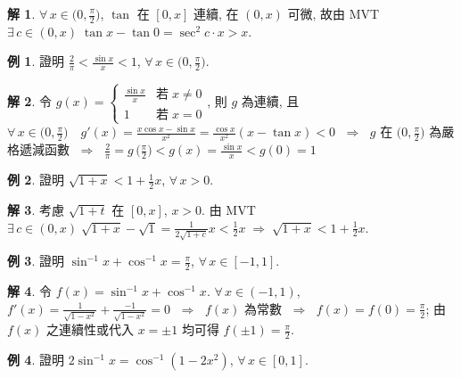 \documentclass[12pt]{extarticle}
\newcommand{\ds}{\displaystyle}
\newcommand{\ie}{\;\Longrightarrow\;}
\theoremstyle{definition}
\newtheorem*{ex}{例}
\newtheorem*{sol}{解}
\begin{document}
\begin{sol}
  $\ds\forall\,x\in\big(0, \frac{\pi}{2}\big)$, $\ds\tan$ 在 $[0, x]$ 連續, 在 $(0, x)$ 可微, 故由 MVT $\ds\exists\,c\in(0, x)\;\tan x - \tan 0 = \sec^2 c\cdot x > x$. 
\end{sol}

\begin{ex}
  證明 $\ds\frac{2}{\pi} < \frac{\sin x}{x} < 1$, $\ds\forall\,x\in\big(0, \frac{\pi}{2}\big)$. 
\end{ex}

\begin{sol}
  令 $\ds g(x) = \begin{cases}\frac{\sin x}{x} & \text{若}\;x\ne 0 \\ 1 & \text{若}\;x = 0 \end{cases}$, 則 $g$ 為連續, 且 $\ds\forall\,x\in\Big(0,\frac{\pi}{2}\Big)\quad g'(x) = \frac{x\cos x - \sin x}{x^2} = \frac{\cos x}{x^2}(x - \tan x) < 0$ $\ie$ $g$ 在 $\ds\Big(0,\frac{\pi}{2}\Big)$ 為嚴格遞減函數 $\ie$ $\ds\frac{2}{\pi} = g\,\Big(\frac{\pi}{2}\Big) < g(x) = \frac{\sin x}{x} < g(0) = 1$     
\end{sol}

\begin{ex}
  證明 $\ds\sqrt{1 + x} < 1 + \frac{1}{2}x$, $\forall\,x > 0$. 
\end{ex}

\begin{sol}
  考慮 $\ds\sqrt{1 + t}$ 在 $\ds[0, x]$, $\ds x > 0$. 由 MVT $\ds\exists\,c\in(0, x)\;\sqrt{1 + x} - \sqrt{1} = \frac{1}{2\sqrt{1 + c}} x < \frac{1}{2}x \ie \sqrt{1 + x} < 1 + \frac{1}{2}x$. 
\end{sol}

\begin{ex}
  證明 $\ds\sin^{-1}x + \cos^{-1}x = \frac{\pi}{2}$, $\forall\,x\in[-1, 1]$. 
\end{ex}

\begin{sol}
  令 $\ds f(x) = \sin^{-1}x + \cos^{-1}x$. $\forall\,x\in(-1, 1)$, $\ds f'(x) = \frac{1}{\sqrt{1 - x^2}} + \frac{-1}{\sqrt{1 - x^2}} = 0$ $\ie$ $f(x)$ 為常數 $\ie$ $\ds f(x) = f(0) = \frac{\pi}{2}$; 由 $f(x)$ 之連續性或代入 $x = \pm 1$ 均可得 $\ds f(\pm 1) = \frac{\pi}{2}$.    
\end{sol}

\begin{ex}
  證明 $\ds 2\sin^{-1}x = \cos^{-1}(1 - 2x^2)$, $\forall\,x\in[0, 1]$. 
\end{ex}
\end{document}
